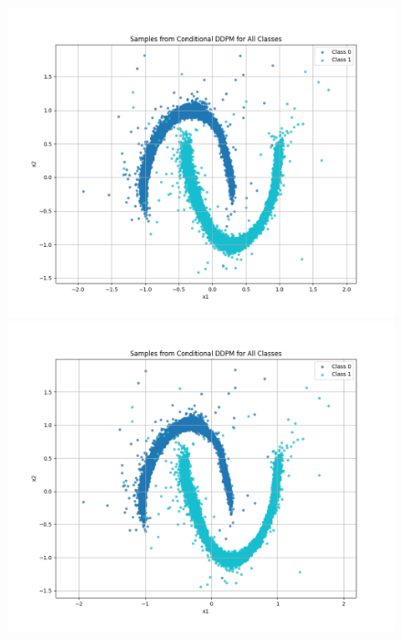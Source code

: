 \documentclass[a4paper,12pt]{article}
\begin{document}
\begin{figure}[H]
  \begin{minipage}{0.3\textwidth}
      \centering
      \includegraphics[width=\linewidth]{"images/Samples - CFG for cond_ddpm_2_50_0.0001_0.02_moons_0.5_sigmoid.png"}
  \end{minipage}
  \begin{minipage}{0.3\textwidth}
      \centering
      \includegraphics[width=\linewidth]{"images/Samples - CFG for cond_ddpm_2_50_0.0001_0.02_moons_0.7_sigmoid.png"}
  \end{minipage}
  \begin{minipage}{0.3\textwidth}

\end{minipage}
\end{figure}
\end{document}
